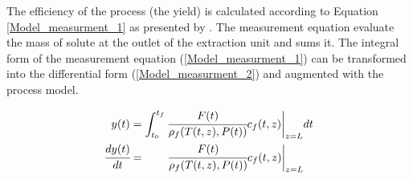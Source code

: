 \documentclass[../Article_Sensitivity_Analsysis.tex]{subfiles}
\begin{document}
		The efficiency of the process (the yield) is calculated according to Equation \ref{Model_measurment_1} as presented by \citet{Sovova1994a}. The measurement equation evaluate the mass of solute at the outlet of the extraction unit and sums it. The integral form of the measurement equation (\ref{Model_measurment_1}) can be transformed into the differential form (\ref{Model_measurment_2}) and augmented with the process model.
			
		{\footnotesize
			\begin{align} 
				\label{Model_measurment_1}
				{\color{black}y}(t) &= \int_{t_0}^{t_f} \cfrac{{\color{black}F}(t)}{{\color{black}\rho_f}({\color{black}T}(t,z),{\color{black}P}(t))} {\color{black}c_f}(t,z) \biggr\rvert_{z=L} dt \\
				\cfrac{d{\color{black}y}(t)}{dt} &= \qquad \cfrac{{\color{black}F}(t)}{{\color{black}\rho_f}({\color{black}T}(t,z),{\color{black}P}(t))} {\color{black}c_f}(t,z) \biggr\rvert_{z=L} 
                \label{Model_measurment_2}
		\end{align}	}
  
\end{document}
